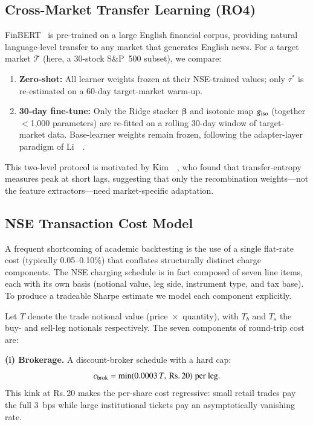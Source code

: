 \subsection{Cross-Market Transfer Learning (RO4)}
\label{subsec:transfer}

FinBERT~\cite{araci2019finbert} is pre-trained on a large English financial
corpus, providing natural language-level transfer to any market that generates
English news. For a target market $\mathcal{T}$ (here, a 30-stock S\&P~500
subset), we compare:
\begin{enumerate}
  \item \textbf{Zero-shot:} All learner weights frozen at their NSE-trained
        values; only $\tau^*$ is re-estimated on a 60-day target-market
        warm-up.
  \item \textbf{30-day fine-tune:} Only the Ridge stacker $\boldsymbol{\beta}$
        and isotonic map $g_{\rm iso}$ (together $<$1{,}000 parameters) are
        re-fitted on a rolling 30-day window of target-market data. Base-learner
        weights remain frozen, following the adapter-layer paradigm of
        Li~\etal~\cite{li2018sentimental}.
\end{enumerate}
This two-level protocol is motivated by Kim~\etal~\cite{kim2020predicting},
who found that transfer-entropy measures peak at short lags, suggesting
that only the recombination weights---not the feature extractors---need
market-specific adaptation.

\subsection{NSE Transaction Cost Model}
\label{subsec:costs}

A frequent shortcoming of academic backtesting is the use of a single
flat-rate cost (typically 0.05--0.10\%) that conflates structurally distinct
charge components. The NSE charging schedule is in fact composed of seven
line items, each with its own basis (notional value, leg side, instrument
type, and tax base). To produce a tradeable Sharpe estimate we model each
component explicitly.

Let $T$ denote the trade notional value (price~$\times$~quantity), with
$T_b$ and $T_s$ the buy- and sell-leg notionals respectively. The seven
components of round-trip cost are:

\textbf{(i) Brokerage.} A discount-broker schedule with a hard cap:
\begin{equation}
c_{\rm brok} = \min(0.0003\,T,\,\text{Rs.}\,20)\;\text{per leg}.
\label{eq:brok}
\end{equation}
This kink at Rs.\,20 makes the per-share cost regressive: small retail
trades pay the full 3~bps while large institutional tickets pay an
asymptotically vanishing rate.

